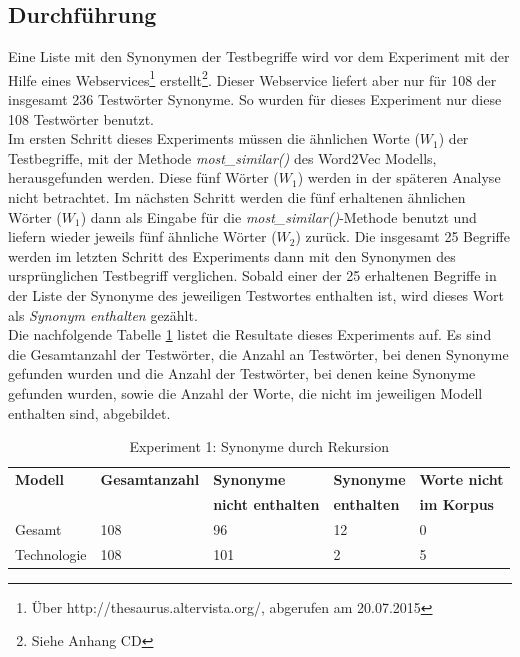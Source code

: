 \documentclass[12pt,a4paper]{report}
\begin{document}
		\subsection*{Durchführung}
		Eine Liste mit den Synonymen der Testbegriffe wird vor dem Experiment mit der Hilfe eines Webservices\footnote{Über http://thesaurus.altervista.org/, abgerufen am 20.07.2015} erstellt\footnote{Siehe Anhang CD}. Dieser Webservice liefert aber nur für 108 der insgesamt 236 Testwörter Synonyme. So wurden für dieses Experiment nur diese 108 Testwörter benutzt.\\
		Im ersten Schritt dieses Experiments müssen die ähnlichen Worte ($W_1$) der Testbegriffe, mit der Methode \textit{most\_similar()} des Word2Vec Modells, herausgefunden werden. Diese fünf Wörter ($W_1$) werden in der späteren Analyse nicht betrachtet. Im nächsten Schritt werden die fünf erhaltenen ähnlichen Wörter ($W_1$) dann als Eingabe für die \textit{most\_similar()}-Methode benutzt und liefern wieder jeweils fünf ähnliche Wörter ($W_2$) zurück. Die insgesamt 25 Begriffe werden im letzten Schritt des Experiments dann mit den Synonymen des ursprünglichen Testbegriff verglichen. Sobald einer der 25 erhaltenen Begriffe in der Liste der Synonyme des jeweiligen Testwortes enthalten ist, wird dieses Wort als \textit{Synonym enthalten} gezählt.\\
		Die nachfolgende Tabelle \ref{tab:experiment1} listet die Resultate dieses Experiments auf. Es sind die Gesamtanzahl der Testwörter, die Anzahl an Testwörter, bei denen Synonyme gefunden wurden und die Anzahl der Testwörter, bei denen keine Synonyme gefunden wurden, sowie die Anzahl der Worte, die nicht im jeweiligen Modell enthalten sind, abgebildet.
		
		

		
		
\begin{table}[H]
\caption{Experiment 1: Synonyme durch Rekursion}
\label{tab:experiment1}
\begin{center}
\begin{tabular}{|l||l|l|l|l|}
\hline
\textbf{Modell} & \textbf{Gesamtanzahl}	&\textbf{Synonyme} & \textbf{Synonyme}  & \textbf{Worte nicht}  \\
 &			& \textbf{nicht enthalten} & \textbf{enthalten} & \textbf{im Korpus}  \\

\hline
 Gesamt & 108 & 96 & 12 & 0 \\
 \hline
 Technologie & 108 & 101 & 2 & 5 \\
 \hline
 
\end{tabular}
\end{center}
\end{table}
		
\end{document}
